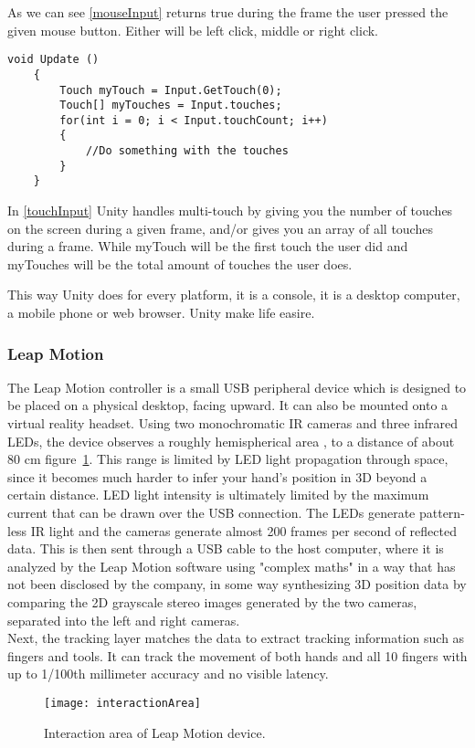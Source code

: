 As we can see \autoref{mouseInput}  returns true during the frame the user pressed the given mouse button. Either will be left click, middle or right click.

\begin{lstlisting}[caption={Multiple touch input for mobile application in Unity \cite{multipletouch}.},label={touchInput}]
void Update () 
    {
        Touch myTouch = Input.GetTouch(0);
        Touch[] myTouches = Input.touches;
        for(int i = 0; i < Input.touchCount; i++)
        {
            //Do something with the touches
        }
    }
\end{lstlisting}

In \autoref{touchInput} Unity handles multi-touch by giving you the number of touches on the screen during a given frame, and/or gives you an array of all touches during a frame. While myTouch will be the first touch the user did and myTouches will be the total amount of touches the user does.

This way Unity does for every platform, it is a console, it is a desktop computer, a mobile phone or web browser. Unity make life easire.
\subsubsection {Leap Motion}

The Leap Motion controller is a small USB peripheral device which is designed to be placed on a physical desktop, facing upward. It can also be mounted onto a virtual reality headset. Using two monochromatic IR cameras and three infrared LEDs, the device observes a roughly hemispherical area , to a distance of about 80 cm \mbox{figure \ref{area}}. This range is limited by LED light propagation through space, since it becomes much harder to infer your hand's position in 3D beyond a certain distance. LED light intensity is ultimately limited by the maximum current that can be drawn over the USB connection. The LEDs generate pattern-less IR light and the cameras generate almost 200 frames per second of reflected data. This is then sent through a USB cable to the host computer, where it is analyzed by the Leap Motion software using "complex maths" in a way that has not been disclosed by the company, in some way synthesizing 3D position data by comparing the 2D  grayscale stereo images generated by the two cameras, separated into the left and right cameras.\\
Next, the tracking layer matches the data to extract tracking information such as fingers and tools. It can track the movement of both hands and all 10 fingers with up to 1/100th millimeter accuracy \cite{accuracy} and no visible latency.
\begin{figure}[!h]
\centering
\texttt{[image: interactionArea]}
\caption{Interaction area of Leap Motion device. \cite{area}}\label{area}
\end{figure}

